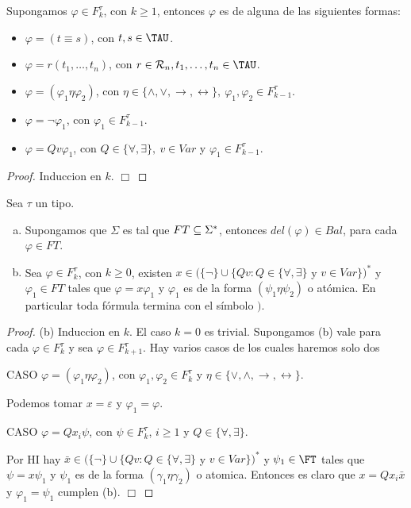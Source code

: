   \begin{lemma}
    \PN Supongamos $\varphi \in F_{k}^{\tau}$, con $k \geq 1$, entonces $\varphi$ es de alguna de las siguientes formas:
    \begin{itemize}
      \item $\varphi = (t \equiv s)$, con $t, s \in \TAU$.
      \item $\varphi = r(t_{1}, \dotsc, t_{n})$, con $r \in \mathcal{R}_{n}, t_{1}, \dotsc, t_{n} \in \TAU$.
      \item $\varphi = (\varphi_{1} \eta \varphi_{2})$, con $\eta \in \{\wedge, \vee, \rightarrow, \leftrightarrow\}, \
        \varphi_{1}, \varphi_{2} \in F_{k-1}^{\tau}$.
      \item $\varphi = \lnot \varphi_{1}$, con $\varphi_{1} \in F_{k-1}^{\tau}$.
      \item $\varphi = Qv \varphi_{1}$, con $Q \in \{\forall, \exists\}, \ v \in Var$ y $\varphi_{1} \in F_{k-1}^{\tau}$.
    \end{itemize}
  \end{lemma}
  \begin{proof}
    Induccion en $k$. $\Box$
  \end{proof}

  \begin{lemma}
    \PN Sea $\tau$ un tipo.
    \begin{enumerate}[a)]
      \item Supongamos que $\Sigma$ es tal que $FT \subseteq \Sigma^{\ast}$, entonces $del(\varphi) \in Bal$, para cada
        $\varphi \in FT$.
      \item Sea $\varphi \in F_{k}^{\tau}$, con $k \geq 0$, existen $x \in (\{\lnot\} \cup \{Qv: Q \in \{\forall,
        \exists\}$ y $v \in Var\})^{\ast}$ y $\varphi_{1} \in FT$ tales que $\varphi = x \varphi_{1}$ y
        $\varphi_{1}$ es de la forma $(\psi_{1} \eta \psi_{2})$ o atómica. En particular toda fórmula termina con el
        símbolo $)$.
    \end{enumerate}
  \end{lemma}
  \begin{proof}
    (b) Induccion en $k$. El caso $k=0$ es trivial. Supongamos (b) vale para cada $\varphi \in F_{k}^{\tau }$ y sea $\varphi \in F_{k+1}^{\tau }$. Hay varios casos de los cuales haremos solo dos

    CASO $\varphi =(\varphi_{1}\eta \varphi_{2})$, con $\varphi_{1},\varphi_{2}\in F_{k}^{\tau }$ y $\eta \in \{\vee ,\wedge ,\rightarrow ,\leftrightarrow \}$.

    Podemos tomar $x=\varepsilon $ y $\varphi_{1}=\varphi $.

    CASO $\varphi =Qx_{i}\psi $, con $\psi \in F_{k}^{\tau }$, $i\geq 1$ y $Q\in \{\forall ,\exists \}$.

    Por HI hay $\bar{x}\in (\{\lnot \}\cup \{Qv:Q\in \{\forall ,\exists \}$ y $v\in Var\})^{\ast }$ y $\psi_{1}\in \FT$ tales que $ \psi =x\psi_{1}$ y $\psi_{1}$ es de la forma $(\gamma_{1}\eta \gamma_{2}) $ o atomica. Entonces es claro que $x=Qx_{i}\bar{x}$ y $\varphi_{1}=\psi_{1}$ cumplen (b). $\Box$
  \end{proof}

